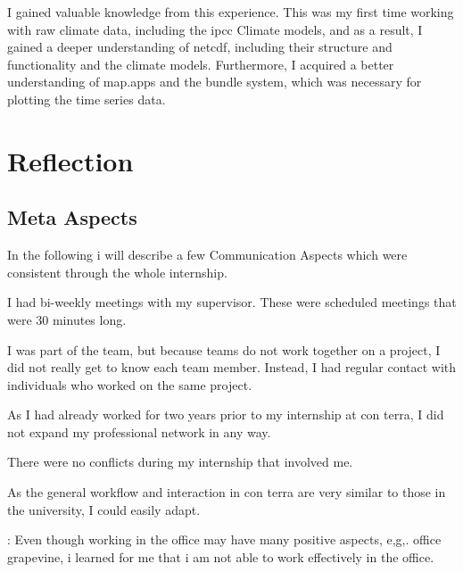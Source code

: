 \documentclass[11pt, titlepage, a4paper]{article}
\begin{document}
I gained valuable knowledge from this experience. This was my first time working with raw climate data, including the \gls{ipcc} Climate models, and as a result, I gained a deeper understanding of \gls{netcdf}, including their structure and functionality and the climate models. Furthermore, I acquired a better understanding of map.apps and the bundle system, which was necessary for plotting the time series data.
\section{Reflection}

\subsection{Meta Aspects}
In the following i will describe a few Communication Aspects which were consistent through the whole internship.
\begin{description}[]
    \item[Supervisor Communication:] I had bi-weekly meetings with my supervisor. These were scheduled meetings that were 30 minutes long.
    \item[Teamwork:] I was part of the team, but because teams do not work together on a project, I did not really get to know each team member. Instead, I had regular contact with individuals who worked on the same project.
    \item[Professional Network:] As I had already worked for two years prior to my internship at con terra, I did not expand my professional network in any way.
    \item[Conflicts:] There were no conflicts during my internship that involved me.
    \item[Applied Communication Skills:]  As the general workflow and interaction in con terra are very similar to those in the university, I could easily adapt.
    \item[] \item[In-Office Work]: Even though working in the office may have many positive aspects, e,g,. office grapevine, i learned for me that i am not able to work effectively in the office.  
\end{description}
\end{document}
